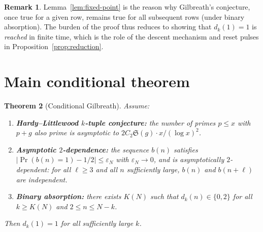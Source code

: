 \documentclass[11pt, a4paper]{amsart}
\theoremstyle{plain}
\newtheorem{theorem}{Theorem}[section]
\theoremstyle{definition}
\newtheorem{remark}[theorem]{Remark}
\renewcommand{\Pr}{\operatorname{Pr}}
\begin{document}
\begin{remark}
Lemma~\ref{lem:fixed-point} is the reason why Gilbreath's conjecture, once true for a given row, remains true
for all subsequent rows (under binary absorption). The burden of the proof thus reduces to showing that
$d_k(1) = 1$ is \emph{reached} in finite time, which is the role of the descent mechanism and reset pulses
in Proposition~\ref{prop:reduction}.
\end{remark}

\section{Main conditional theorem}
\label{sec:main}

\begin{theorem}[Conditional Gilbreath]\label{thm:main}
Assume:
\begin{enumerate}
\item[\textup{(H1)}] \textbf{Hardy--Littlewood $k$-tuple conjecture:} the number of primes $p \le x$ with $p + g$ also prime is asymptotic to $2C_2 \mathfrak{S}(g) \cdot x/(\log x)^2$.
\item[\textup{(H2)}] \textbf{Asymptotic $2$-dependence:} the sequence $b(n)$ satisfies $|\Pr(b(n)=1) - 1/2| \le \varepsilon_N$ with $\varepsilon_N \to 0$,
and is asymptotically $2$-dependent: for all $\ell \ge 3$ and all $n$ sufficiently large, $b(n)$ and $b(n+\ell)$ are independent.
\item[\textup{(H3)}] \textbf{Binary absorption:} there exists $K(N)$ such that $d_k(n) \in \{0, 2\}$ for all $k \ge K(N)$ and $2 \le n \le N - k$.
\end{enumerate}
Then $d_k(1) = 1$ for all sufficiently large $k$.
\end{theorem}
\end{document}
